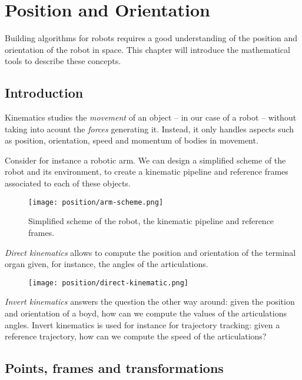 \section{Position and Orientation}
Building algorithms for robots requires a good understanding of the position and orientation of the robot in space. This chapter will introduce the mathematical tools to describe these concepts.
\subsection{Introduction}
Kinematics studies the \emph{movement} of an object -- in our case of a robot -- without taking into acount the \emph{forces} generating it. Instead, it only handles aspects such as position, orientation, speed and momentum of bodies in movement.

Consider for instance a robotic arm. We can design a simplified scheme of the robot and its environment, to create a kinematic pipeline and reference frames associated to each of these objects.

\begin{figure}[H]
    \centering
    \texttt{[image: position/arm-scheme.png]}
    \caption{Simplified scheme of the robot, the kinematic pipeline and reference frames.}
\end{figure}

\emph{Direct kinematics} allows to compute the position and orientation of the terminal organ given, for instance, the angles of the articulations.

\begin{figure}[H]
    \centering
    \texttt{[image: position/direct-kinematic.png]}
\end{figure}

\emph{Invert kinematics} answers the question the other way around: given the position and orientation of a boyd, how can we compute the values of the articulations angles. Invert kinematics is used for instance for trajectory tracking: given a reference trajectory, how can we compute the speed of the articulations?

\subsection{Points, frames and transformations}
